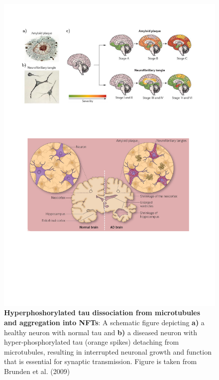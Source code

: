 \begin{figure}[!ht]
	\centering
	\includegraphics[page=13,trim={0 14cm 0cm 2cm},clip, scale = 0.6]{Figures/Introduction_Figures.pdf}
	\captionsetup{width=0.95\textwidth,singlelinecheck=off}
	\caption[Tau tangle hypothesis in AD]%
	{\textbf{Hyperphoshorylated tau dissociation from microtubules and aggregation into NFTs}: A schematic figure depicting \textbf{a)} a healthy neuron with normal tau and \textbf{b)} a diseased neuron with hyper-phosphorylated tau (orange spikes) detaching from microtubules, resulting in interrupted neuronal growth and function that is essential for synaptic transmission. Figure is taken from Brunden et al. (2009)\cite{Brunden2009}
	}
	\label{fig:tau_hypothesis}
\end{figure}	

